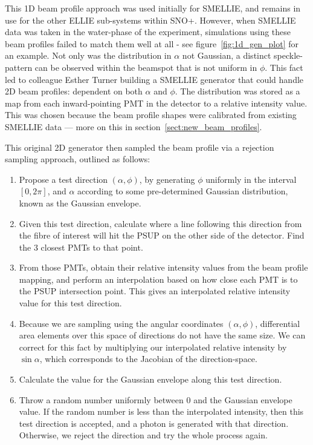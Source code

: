This 1D beam profile approach was used initially for SMELLIE, and remains in use for the other ELLIE sub-systems within SNO+. However, when SMELLIE data was taken in the water-phase of the experiment, simulations using these beam profiles failed to match them well at all - see figure~\ref{fig:1d_gen_plot} for an example. Not only was the distribution in $\alpha$ not Gaussian, a distinct speckle-pattern can be observed within the beamspot that is not uniform in $\phi$. This fact led to colleague Esther Turner building a SMELLIE generator that could handle 2D beam profiles: dependent on both $\alpha$ and $\phi$. The distribution was stored as a map from each inward-pointing PMT in the detector to a relative intensity value. This was chosen because the beam profile shapes were calibrated from existing SMELLIE data --- more on this in section~\ref{sect:new_beam_profiles}.

This original 2D generator then sampled the beam profile via a rejection sampling approach, outlined as follows:
\begin{enumerate}
    \item Propose a test direction $(\alpha, \phi)$, by generating $\phi$ uniformly in the interval $[0, 2\pi]$, and $\alpha$ according to some pre-determined Gaussian distribution, known as the Gaussian envelope.
    \item Given this test direction, calculate where a line following this direction from the fibre of interest will hit the PSUP on the other side of the detector. Find the 3 closest PMTs to that point.
    \item From those PMTs, obtain their relative intensity values from the beam profile mapping, and perform an interpolation based on how close each PMT is to the PSUP intersection point. This gives an interpolated relative intensity value for this test direction.
    \item Because we are sampling using the angular coordinates $(\alpha, \phi)$, differential area elements over this space of directions do not have the same size. We can correct for this fact by multiplying our interpolated relative intensity by $\sin{\alpha}$, which corresponds to the Jacobian of the direction-space.
    \item Calculate the value for the Gaussian envelope along this test direction.
    \item Throw a random number uniformly between 0 and the Gaussian envelope value. If the random number is less than the interpolated intensity, then this test direction is accepted, and a photon is generated with that direction. Otherwise, we reject the direction and try the whole process again.
\end{enumerate}

